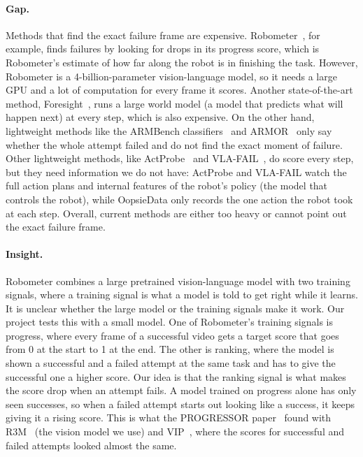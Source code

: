 \documentclass{article}
\begin{document}
\paragraph{Gap.} Methods that find the exact failure frame are expensive. Robometer~\citep{robometer}, for example, finds failures by looking for drops in its progress score, which is Robometer's estimate of how far along the robot is in finishing the task. However, Robometer is a 4-billion-parameter vision-language model, so it needs a large GPU and a lot of computation for every frame it scores. Another state-of-the-art method, Foresight~\citep{foresight}, runs a large world model (a model that predicts what will happen next) at every step, which is also expensive. On the other hand, lightweight methods like the ARMBench classifiers~\citep{armbench} and ARMOR~\citep{armor} only say whether the whole attempt failed and do not find the exact moment of failure. Other lightweight methods, like ActProbe~\citep{actprobe} and VLA-FAIL~\citep{vlafail}, do score every step, but they need information we do not have: ActProbe and VLA-FAIL watch the full action plans and internal features of the robot's policy (the model that controls the robot), while OopsieData only records the one action the robot took at each step. Overall, current methods are either too heavy or cannot point out the exact failure frame.

\paragraph{Insight.} Robometer combines a large pretrained vision-language model with two training signals, where a training signal is what a model is told to get right while it learns. It is unclear whether the large model or the training signals make it work. Our project tests this with a small model. One of Robometer's training signals is progress, where every frame of a successful video gets a target score that goes from 0 at the start to 1 at the end. The other is ranking, where the model is shown a successful and a failed attempt at the same task and has to give the successful one a higher score. Our idea is that the ranking signal is what makes the score drop when an attempt fails. A model trained on progress alone has only seen successes, so when a failed attempt starts out looking like a success, it keeps giving it a rising score. This is what the PROGRESSOR paper~\citep{progressor} found with R3M~\citep{r3m} (the vision model we use) and VIP~\citep{vip}, where the scores for successful and failed attempts looked almost the same.
\end{document}
